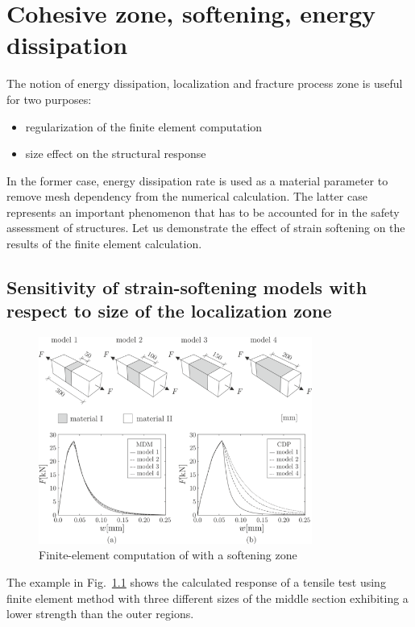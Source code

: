 \documentclass[main.tex]{subfiles}
\begin{document}
\chapter{Cohesive zone, softening, energy dissipation}
\label{LEC:CohesiveCrackModel}

The notion of energy dissipation, localization and fracture process zone is useful for two purposes:
\begin{itemize}
    \item regularization of the finite element computation
    \item size effect on the structural response
\end{itemize}
In the former case, energy dissipation rate is used as a material parameter 
to remove mesh dependency from the numerical calculation. 
The latter case represents an important phenomenon that has to be accounted for in the safety assessment
of structures. Let us demonstrate the effect of strain softening on the 
results of the finite element calculation.

\section{Sensitivity of strain-softening models with respect to size of the localization zone}

\begin{figure}[ht]
	\centering
  \includegraphics[width=0.8\textwidth]{fig/Lecture07/mesh_sensitivity.png}
	\caption{Finite-element computation of with a softening zone}
	\label{FIGDrawingEnergyPullout}
\end{figure}

The example in Fig.~\ref{FIGDrawingEnergyPullout} shows the calculated response of a tensile test using finite element method with three different sizes of the middle section exhibiting a lower strength than the outer regions.
\end{document}
